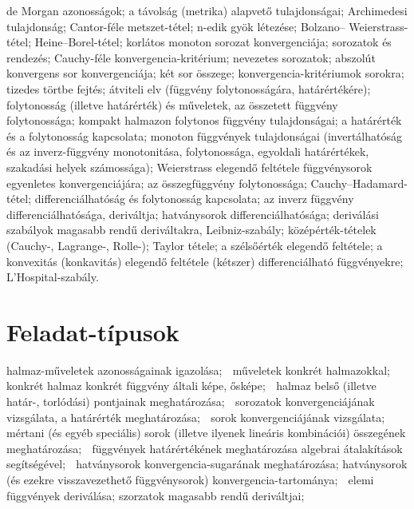 \documentclass{article}
\begin{document}
de Morgan azonosságok; a távolság (metrika) alapvető tulajdonságai;
Archimedesi tulajdonság; Cantor-féle metszet-tétel; n-edik gyök létezése; Bolzano–
Weierstrass-tétel; Heine–Borel-tétel; korlátos monoton sorozat konvergenciája;
sorozatok és rendezés; Cauchy-féle konvergencia-kritérium; nevezetes sorozatok;
abszolút konvergens sor konvergenciája; két sor összege; konvergencia-kritériumok
sorokra; tizedes törtbe fejtés; átviteli elv (függvény folytonosságára, határértékére);
folytonosság (illetve határérték) és műveletek, az összetett függvény folytonossága;
kompakt halmazon folytonos függvény tulajdonságai; a határérték és a folytonosság
kapcsolata; monoton függvények tulajdonságai (invertálhatóság és az inverz-függvény
monotonitása, folytonossága, egyoldali határértékek, szakadási helyek számossága);
Weierstrass elegendő feltétele függvénysorok egyenletes konvergenciájára; az
összegfüggvény folytonossága; Cauchy–Hadamard-tétel; differenciálhatóság és
folytonosság kapcsolata; az inverz függvény differenciálhatósága, deriváltja;
hatványsorok differenciálhatósága; deriválási szabályok magasabb rendű deriváltakra,
Leibniz-szabály; középérték-tételek (Cauchy-, Lagrange-, Rolle-); Taylor tétele; a
szélsőérték elegendő feltétele; a konvexitás (konkavitás) elegendő feltétele (kétszer)
differenciálható függvényekre; L’Hospital-szabály. 

\section{Feladat-típusok}

halmaz-műveletek azonosságainak igazolása;
 műveletek konkrét halmazokkal;
 konkrét halmaz konkrét függvény általi képe, ősképe;
 halmaz belső (illetve határ-, torlódási) pontjainak meghatározása;
 sorozatok konvergenciájának vizsgálata, a határérték meghatározása;
 sorok konvergenciájának vizsgálata; mértani (és egyéb speciális) sorok (illetve
ilyenek lineáris kombinációi) összegének meghatározása;
 függvények határértékének meghatározása algebrai átalakítások segítségével;
 hatványsorok konvergencia-sugarának meghatározása; hatványsorok (és ezekre
visszavezethető függvénysorok) konvergencia-tartománya;
 elemi függvények deriválása; szorzatok magasabb rendű deriváltjai;
\end{document}
